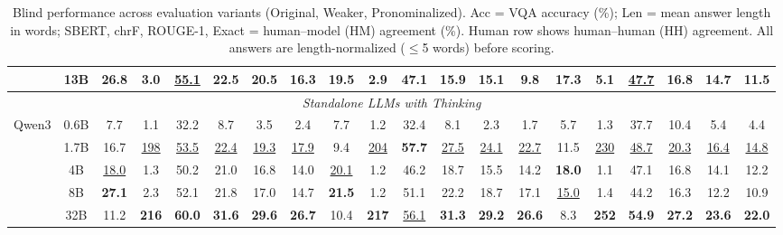 \begin{table}[t]
{\begin{tabular}{lc|cccccc|cccccc|cccccc}
 & 13B & 26.8 & 3.0 & \underline{55.1} & 22.5 & 20.5 & 16.3 & 19.5 & 2.9 & 47.1 & 15.9 & 15.1 & 9.8 & 17.3 & 5.1 & \underline{47.7} & 16.8 & 14.7 & 11.5 \\
\midrule
\multicolumn{20}{c}{\textit{Standalone LLMs with Thinking}} \\
\midrule
\multirow{5}{*}{Qwen3} & 0.6B & 7.7 & 1.1 & 32.2 & 8.7 & 3.5 & 2.4 & 7.7 & 1.2 & 32.4 & 8.1 & 2.3 & 1.7 & 5.7 & 1.3 & 37.7 & 10.4 & 5.4 & 4.4 \\
 & 1.7B & 16.7 & \underline{198} & \underline{53.5} & \underline{22.4} & \underline{19.3} & \underline{17.9} & 9.4 & \underline{204} & \textbf{57.7} & \underline{27.5} & \underline{24.1} & \underline{22.7} & 11.5 & \underline{230} & \underline{48.7} & \underline{20.3} & \underline{16.4} & \underline{14.8} \\
 & 4B & \underline{18.0} & 1.3 & 50.2 & 21.0 & 16.8 & 14.0 & \underline{20.1} & 1.2 & 46.2 & 18.7 & 15.5 & 14.2 & \textbf{18.0} & 1.1 & 47.1 & 16.8 & 14.1 & 12.2 \\
 & 8B & \textbf{27.1} & 2.3 & 52.1 & 21.8 & 17.0 & 14.7 & \textbf{21.5} & 1.2 & 51.1 & 22.2 & 18.7 & 17.1 & \underline{15.0} & 1.4 & 44.2 & 16.3 & 12.2 & 10.9 \\
 & 32B & 11.2 & \textbf{216} & \textbf{60.0} & \textbf{31.6} & \textbf{29.6} & \textbf{26.7} & 10.4 & \textbf{217} & \underline{56.1} & \textbf{31.3} & \textbf{29.2} & \textbf{26.6} & 8.3 & \textbf{252} & \textbf{54.9} & \textbf{27.2} & \textbf{23.6} & \textbf{22.0} \\
\bottomrule
\end{tabular}
}
\caption{\small Blind performance across evaluation variants (Original, Weaker, Pronominalized). Acc = VQA accuracy (\%); Len = mean answer length in words; SBERT, chrF, ROUGE-1, Exact = human--model (HM) agreement (\%). Human row shows human--human (HH) agreement. All answers are length-normalized ($\leq$5 words) before scoring.}
\label{tab:comprehensive_inst_blind_w5}
\end{table}
